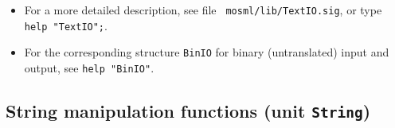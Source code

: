 \documentclass[fleqn]{article}
\begin{document}
\begin{itemize}
\item For a more detailed description, see file {\tt
    mosml/lib/TextIO.sig}, or type {\tt help "TextIO";}.  

\item For the corresponding structure {\tt BinIO} for binary
  (untranslated) input and output, see {\tt help "BinIO"}.

\end{itemize}


\subsection*{String manipulation functions (unit {\tt String})}
\end{document}
